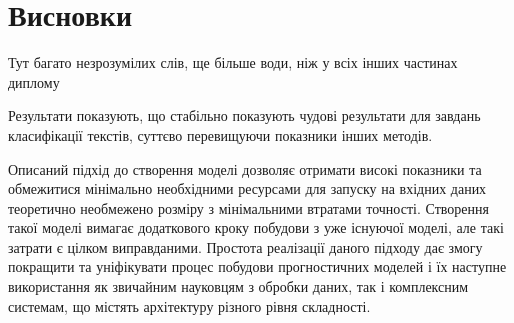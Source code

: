\section{Висновки}

Тут багато незрозумілих слів, ще більше води, ніж у всіх інших частинах диплому

Результати показують, що стабільно показують чудові результати для завдань класифікації
текстів, суттєво перевищуючи показники інших методів.

Описаний підхід до створення моделі дозволяє отримати високі показники та обмежитися мінімально необхідними ресурсами для запуску на вхідних даних теоретично необмежено розміру з мінімальними втратами точності. Створення такої моделі вимагає додаткового кроку побудови з уже існуючої моделі, але такі затрати є цілком виправданими.
Простота реалізації даного підходу дає змогу покращити та уніфікувати процес побудови прогностичних моделей і їх наступне використання як звичайним науковцям з обробки даних, так і комплексним системам, що містять архітектуру різного рівня складності.

